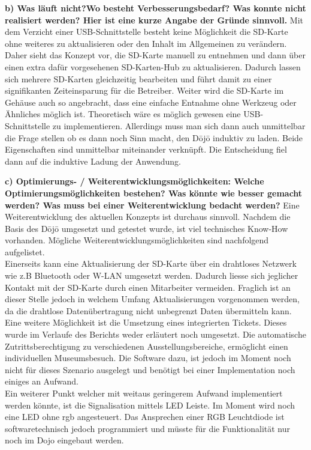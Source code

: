 \textbf{b) Was läuft nicht?Wo besteht Verbesserungsbedarf? Was konnte nicht realisiert werden? Hier ist eine kurze Angabe der Gründe sinnvoll.}
Mit dem Verzicht einer USB-Schnittstelle besteht keine Möglichkeit die SD-Karte ohne weiteres zu aktualisieren oder den Inhalt im Allgemeinen zu verändern. Daher sieht das Konzept vor, die SD-Karte manuell zu entnehmen und dann über einen extra dafür vorgesehenen SD-Karten-Hub zu aktualisieren. Dadurch lassen sich mehrere SD-Karten gleichzeitig bearbeiten und führt damit zu einer signifikanten Zeiteinsparung für die Betreiber. Weiter wird die SD-Karte im Gehäuse auch so angebracht, dass eine einfache Entnahme ohne Werkzeug oder Ähnliches möglich ist. Theoretisch wäre es möglich gewesen eine USB-Schnittstelle zu implementieren. Allerdings muss man sich dann auch unmittelbar die Frage stellen ob es dann noch Sinn macht, den Dōjō induktiv zu laden. Beide Eigenschaften sind unmittelbar miteinander verknüpft. Die Entscheidung fiel dann auf die induktive Ladung der Anwendung.
 
\textbf{c) Optimierungs- / Weiterentwicklungsmöglichkeiten: Welche Optimierungsmöglichkeiten bestehen? Was könnte wie besser gemacht werden? Was muss bei einer Weiterentwicklung bedacht werden?}
Eine Weiterentwicklung des aktuellen Konzepts ist durchaus sinnvoll. Nachdem die Basis des Dōjō umgesetzt und getestet wurde, ist viel technisches \glqq Know-How \grqq vorhanden. Mögliche Weiterentwicklungsmöglichkeiten sind nachfolgend aufgelistet.\\
Einerseits kann eine Aktualisierung der SD-Karte über ein drahtloses Netzwerk wie z.B Bluetooth oder W-LAN umgesetzt werden. Dadurch liesse sich jeglicher Kontakt mit der SD-Karte durch einen Mitarbeiter vermeiden. Fraglich ist an dieser Stelle jedoch in welchem Umfang Aktualisierungen vorgenommen werden, da die drahtlose Datenübertragung nicht unbegrenzt Daten übermitteln kann.\\
Eine weitere Möglichkeit ist die Umsetzung eines integrierten Tickets. Dieses wurde im Verlaufe des Berichts weder erläutert noch umgesetzt. Die automatische Zutrittsberechtigung zu verschiedenen Ausstellungsbereiche, ermöglicht einen individuellen Museumsbesuch. Die Software dazu, ist jedoch im Moment noch nicht für dieses Szenario ausgelegt und benötigt bei einer Implementation noch einiges an Aufwand.\\
Ein weiterer Punkt welcher mit weitaus geringerem Aufwand implementiert werden könnte, ist die Signalisation mittels LED Leiste. Im Moment wird noch eine LED ohne rgb angesteuert. Das Ansprechen einer RGB Leuchtdiode ist softwaretechnisch jedoch programmiert und müsste für die Funktionalität nur noch im Dojo eingebaut werden. 